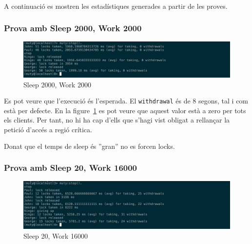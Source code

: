 \documentclass[a4paper, 11pt]{article}
\begin{document}
A continuació es mostren les estadístiques generades a partir de les proves.

\subsubsection{Prova amb Sleep 2000, Work 2000}

\begin{figure}[H]
	\centering
    \includegraphics[width=1.0\textwidth]{figures/2000-2000lock1}
    \caption{Sleep 2000, Work 2000 \label{fig:2000-2000lock1}}    
\end{figure}


Es pot veure que l'execució és l'esperada. El \texttt{withdrawal} és de 8
segons, tal i com està per defecte. En la figure~\ref{fig:2000-2000lock1} es pot
veure que aquest valor està a zero per tots els clients. Per tant, no hi ha cap
d'ells que s'hagi vist obligat a rellançar la petició d'accés a regió crítica.

Donat que el temps de sleep és ''gran'' no es forcen locks. 

\subsubsection{Prova amb Sleep 20, Work 16000}

\begin{figure}[H]
	\centering
    \includegraphics[width=1.0\textwidth]{figures/20-16000lock1}
    \caption{Sleep 20, Work 16000 \label{fig:20-16000lock1}}    
\end{figure}
\end{document}
